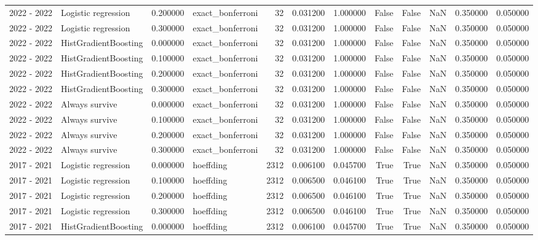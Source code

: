 \begin{tabular}{llrlrrrrrrrr}
2022 - 2022 & Logistic regression & 0.200000 & exact_bonferroni & 32 & 0.031200 & 1.000000 & False & False & NaN & 0.350000 & 0.050000 \\
2022 - 2022 & Logistic regression & 0.300000 & exact_bonferroni & 32 & 0.031200 & 1.000000 & False & False & NaN & 0.350000 & 0.050000 \\
2022 - 2022 & HistGradientBoosting & 0.000000 & exact_bonferroni & 32 & 0.031200 & 1.000000 & False & False & NaN & 0.350000 & 0.050000 \\
2022 - 2022 & HistGradientBoosting & 0.100000 & exact_bonferroni & 32 & 0.031200 & 1.000000 & False & False & NaN & 0.350000 & 0.050000 \\
2022 - 2022 & HistGradientBoosting & 0.200000 & exact_bonferroni & 32 & 0.031200 & 1.000000 & False & False & NaN & 0.350000 & 0.050000 \\
2022 - 2022 & HistGradientBoosting & 0.300000 & exact_bonferroni & 32 & 0.031200 & 1.000000 & False & False & NaN & 0.350000 & 0.050000 \\
2022 - 2022 & Always survive & 0.000000 & exact_bonferroni & 32 & 0.031200 & 1.000000 & False & False & NaN & 0.350000 & 0.050000 \\
2022 - 2022 & Always survive & 0.100000 & exact_bonferroni & 32 & 0.031200 & 1.000000 & False & False & NaN & 0.350000 & 0.050000 \\
2022 - 2022 & Always survive & 0.200000 & exact_bonferroni & 32 & 0.031200 & 1.000000 & False & False & NaN & 0.350000 & 0.050000 \\
2022 - 2022 & Always survive & 0.300000 & exact_bonferroni & 32 & 0.031200 & 1.000000 & False & False & NaN & 0.350000 & 0.050000 \\
2017 - 2021 & Logistic regression & 0.000000 & hoeffding & 2312 & 0.006100 & 0.045700 & True & True & NaN & 0.350000 & 0.050000 \\
2017 - 2021 & Logistic regression & 0.100000 & hoeffding & 2312 & 0.006500 & 0.046100 & True & True & NaN & 0.350000 & 0.050000 \\
2017 - 2021 & Logistic regression & 0.200000 & hoeffding & 2312 & 0.006500 & 0.046100 & True & True & NaN & 0.350000 & 0.050000 \\
2017 - 2021 & Logistic regression & 0.300000 & hoeffding & 2312 & 0.006500 & 0.046100 & True & True & NaN & 0.350000 & 0.050000 \\
2017 - 2021 & HistGradientBoosting & 0.000000 & hoeffding & 2312 & 0.006100 & 0.045700 & True & True & NaN & 0.350000 & 0.050000 \\

\end{tabular}
